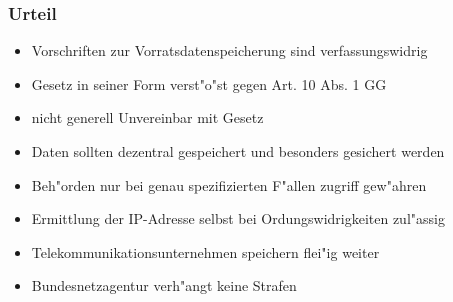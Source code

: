   \begin{frame}
    \frametitle{Urteil}
    \begin{itemize}
      \item Vorschriften zur Vorratsdatenspeicherung sind verfassungswidrig
      \item Gesetz in seiner Form verst"o"st gegen Art. 10 Abs. 1 GG
      \item nicht generell Unvereinbar mit Gesetz
      \item Daten sollten dezentral gespeichert und besonders gesichert werden
      \item Beh"orden nur bei genau spezifizierten F"allen zugriff gew"ahren
      \item Ermittlung der IP-Adresse selbst bei Ordungswidrigkeiten zul"assig
      \item Telekommunikationsunternehmen speichern flei"ig weiter
      \item Bundesnetzagentur verh"angt keine Strafen
    \end{itemize}
  \end{frame}
